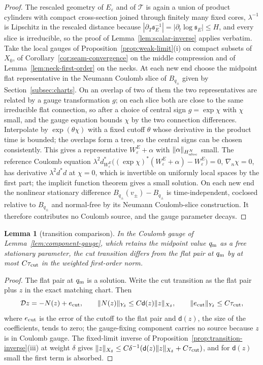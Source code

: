 \documentclass[11pt]{amsart}
\newtheorem{lemma}[theorem]{Lemma}
\theoremstyle{definition}
\theoremstyle{remark}
\theoremstyle{plain}
\numberwithin{equation}{section}
\newcommand{\eps}{\varepsilon}
\begin{document}
\begin{proof}
The rescaled geometry of $E_\eps$ and of $\mathcal T$ is again a union of product
cylinders with compact cross-section joined through finitely many fixed cores,
$\lambda^{-1}$ is Lipschitz in the rescaled distance because
$|\partial_T{\mathfrak s}_E^{-1}|=|\partial_t\log{\mathfrak s}_E|\le H$, and every slice is irreducible, so the
proof of Lemma~\ref{lem:scalar-inverse} applies verbatim. Take the local gauges of Proposition~\ref{prop:weak-limit}(i) on compact subsets
of $X_0$, of Corollary~\ref{cor:seam-convergence} on the middle compression and of
Lemma~\ref{lem:neck-first-order} on the necks. At each new end choose the
midpoint flat representative in the Neumann Coulomb slice of $B_{q_\pm}$
given by Section~\ref{subsec:charts}. On an overlap of two of them the two
representatives are related by a gauge transformation $g$; on each slice both are
close to the same irreducible flat connection, so after a choice of central sign
$g=\exp\chi$ with $\chi$ small, and the gauge equation bounds $\chi$ by the two
connection differences. Interpolate by $\exp(\theta\chi)$ with a fixed cutoff $\theta$
whose derivative in the product time is bounded; the overlaps form a tree, so the
central signs can be chosen consistently. This gives a representative $W^E_\eps+\alpha$
with $\|\alpha\|_{H^N_{\rm uloc}}$ small. The reference Coulomb equation
$\lambda^2d^*_{W^E_\eps}\bigl((\exp\chi)^*(W^E_\eps+\alpha)-W^E_\eps\bigr)=0$, $\nabla_n\chi=0$, has
derivative $\lambda^2d^*d$ at $\chi=0$, which is invertible on uniformly local spaces
by the first part; the implicit function theorem gives a small solution.
On each new end the nonlinear stationary difference
$B_{q_\pm}(v_\pm)-B_{q_\pm}$ is time-independent, coclosed relative to
$B_{q_\pm}$ and normal-free by its Neumann Coulomb-slice construction.
It therefore contributes no Coulomb source, and the gauge parameter decays.
\end{proof}

\begin{lemma}[transition comparison]\label{lem:transition-comparison}
In the Coulomb gauge of Lemma~\ref{lem:component-gauge}, which retains the midpoint
value $q_{\rm m}$ as a free stationary parameter, the cut transition differs from the flat
pair at $q_{\rm m}$ by at most $C\tau_{\rm cut}$ in the weighted first-order norm.
\end{lemma}

\begin{proof}
The flat pair at $q_{\rm m}$ is a solution. Write the cut transition as the flat pair
plus $z$ in the exact matching chart. Then
\[
\mathcal Dz=-N(z)+e_{\rm cut},\qquad \|N(z)\|_{Y_\delta}\le C\mathsf d(z)\|z\|_{X_\delta},\qquad
\|e_{\rm cut}\|_{Y_\delta}\le C\tau_{\rm cut},
\]
where $e_{\rm cut}$ is the error of the cutoff to the flat pair and $\mathsf d(z)$, the
size of the coefficients, tends to zero; the gauge-fixing component carries no
source because $z$ is in Coulomb gauge. The fixed-limit inverse of
Proposition~\ref{prop:transition-inverse}(iii) at weight $\delta$ gives
$\|z\|_{X_\delta}\le C\delta^{-1}(\mathsf d(z)\|z\|_{X_\delta}+C\tau_{\rm cut})$, and for $\mathsf d(z)$ small
the first term is absorbed.
\end{proof}
\end{document}
